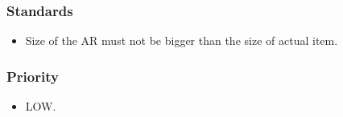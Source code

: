 \subsubsection{Standards}
\begin{itemize}
    \item Size of the AR must not be bigger than the size of actual item.
\end{itemize}
\subsubsection{Priority}
\begin{itemize}
\item LOW.\\ \\
\end{itemize}